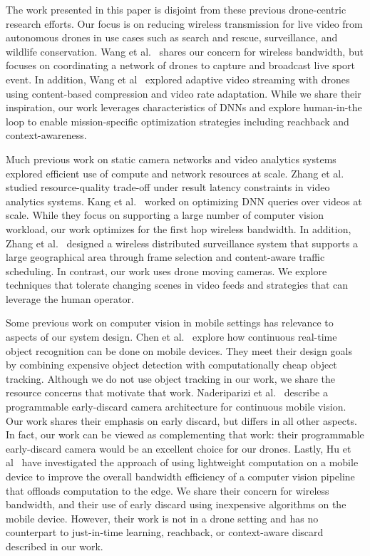 The work presented in this paper is disjoint from these previous drone-centric
research efforts. Our focus is on reducing wireless transmission for live video
from autonomous drones in use cases such as search and rescue, surveillance, and
wildlife conservation. Wang et al.~\cite{Wang2017networked} shares our concern
for wireless bandwidth, but focuses on coordinating a network of drones to
capture and broadcast live sport event. In addition, Wang et
al~\cite{Wang2016skyeyes} explored adaptive video streaming with drones using
content-based compression and video rate adaptation. While we share their
inspiration, our work leverages characteristics of DNNs and explore human-in-the
loop to enable mission-specific optimization strategies including reachback and
context-awareness.

Much previous work on static camera networks and video analytics systems
explored efficient use of compute and network resources at scale. Zhang et
al.~\cite{zhang2017live} studied resource-quality trade-off under result latency
constraints in video analytics systems. Kang et al.~\cite{kang2017noscope} worked
on optimizing DNN queries over videos at scale. While they focus on supporting a
large number of computer vision workload, our work optimizes for the first hop
wireless bandwidth. In addition, Zhang et al.~\cite{zhang2015design} designed a
wireless distributed surveillance system that supports a large geographical area
through frame selection and content-aware traffic scheduling. In contrast, our
work uses drone moving cameras. We explore techniques that tolerate changing
scenes in video feeds and strategies that can leverage the human operator.

Some previous work on computer vision in mobile settings has relevance to
aspects of our system design.  Chen et al.~\cite{Chen2015b} explore how
continuous real-time object recognition can be done on mobile devices. They meet
their design goals by combining expensive object detection with computationally
cheap object tracking.  Although we do not use object tracking in our work, we
share the resource concerns that motivate that work.  Naderiparizi et
al.~\cite{naderiparizi2017glimpse} describe a programmable early-discard camera
architecture for continuous mobile vision.  Our work shares their emphasis on
early discard, but differs in all other aspects.  In fact, our work can be
viewed as complementing that work: their programmable early-discard camera would
be an excellent choice for our drones. Lastly, Hu et al~\cite{Hu2015} have
investigated the approach of using lightweight computation on a mobile device to
improve the overall bandwidth efficiency of a computer vision pipeline that
offloads computation to the edge.  We share their concern for wireless
bandwidth, and their use of early discard using inexpensive algorithms on the
mobile device.  However, their work is not in a drone setting and has no
counterpart to just-in-time learning, reachback, or context-aware discard
described in our work.
